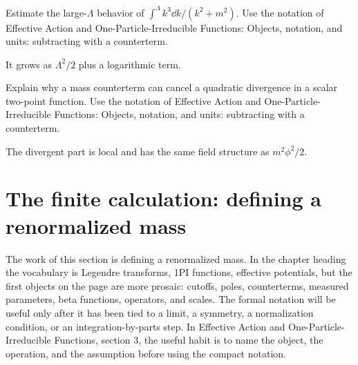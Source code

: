 \begin{exercise}
Estimate the large-\(\Lambda\) behavior of \(\int^\Lambda k^3\dd k/(k^2+m^2)\).  Use the notation of Effective Action and One-Particle-Irreducible Functions: Objects, notation, and units: subtracting with a counterterm.
\begin{answer}
It grows as \(\Lambda^2/2\) plus a logarithmic term.
\end{answer}
\end{exercise}

\begin{exercise}
Explain why a mass counterterm can cancel a quadratic divergence in a scalar two-point function.  Use the notation of Effective Action and One-Particle-Irreducible Functions: Objects, notation, and units: subtracting with a counterterm.
\begin{answer}
The divergent part is local and has the same field structure as \(m^2\phi^2/2\).
\end{answer}
\end{exercise}



\section{The finite calculation: defining a renormalized mass}













The work of this section is defining a renormalized mass.  In the chapter heading the vocabulary is Legendre transforms, 1PI functions, effective potentials, but the first objects on the page are more prosaic: cutoffs, poles, counterterms, measured parameters, beta functions, operators, and scales.  The formal notation will be useful only after it has been tied to a limit, a symmetry, a normalization condition, or an integration-by-parts step.  In Effective Action and One-Particle-Irreducible Functions, section 3, the useful habit is to name the object, the operation, and the assumption before using the compact notation.

